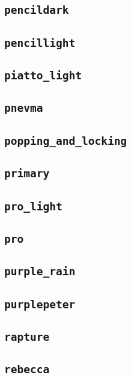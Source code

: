 \subsection{\texttt{pencildark}}
\newpage
\subsection{\texttt{pencillight}}
\newpage
\subsection{\texttt{piatto\_light}}
\newpage
\subsection{\texttt{pnevma}}
\newpage
\subsection{\texttt{popping\_and\_locking}}
\newpage
\subsection{\texttt{primary}}
\newpage
\subsection{\texttt{pro\_light}}
\newpage
\subsection{\texttt{pro}}
\newpage
\subsection{\texttt{purple\_rain}}
\newpage
\subsection{\texttt{purplepeter}}
\newpage
\subsection{\texttt{rapture}}
\newpage
\subsection{\texttt{rebecca}}
\newpage
